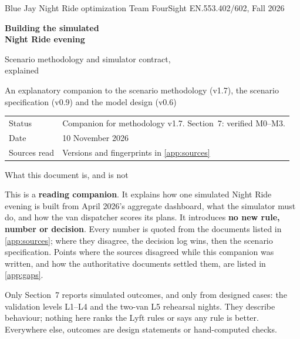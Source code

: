 \documentclass[11pt,letterpaper]{article}
\newenvironment{callout}[1][]{%
  \def\FrameCommand{\fboxsep=8pt\colorbox{shade}}%
  \MakeFramed{\advance\hsize-\width\FrameRestore}%
  \ifx\relax#1\relax\else{\sffamily\bfseries\color{heading}#1}\par\smallskip\fi}%
  {\endMakeFramed}
\begin{document}
\begin{titlepage}
\thispagestyle{empty}
\vspace*{0.6in}
{\sffamily\small\color{muted} Blue Jay Night Ride optimization \textbar{} Team FourSight \textbar{} EN.553.402/602, Fall 2026\par}
\vspace{0.25in}
{\sffamily\fontsize{24}{29}\selectfont\bfseries\color{heading} Building the simulated\\ Night Ride evening\par}
\vspace{0.12in}
{\sffamily\Large\color{heading} Scenario methodology and simulator contract,\\ explained\par}
\vspace{0.35in}
{\large An explanatory companion to the scenario methodology (v1.7), the scenario specification (v0.9) and the model design (v0.6)\par}
\vspace{0.3in}
{\sffamily\small
\begin{tabular}{@{}ll@{}}
Status & Companion for methodology v1.7. Section~7: verified M0--M3.\\
Date & 10 November 2026\\
Sources read & Versions and fingerprints in \cref{app:sources}\\
\end{tabular}\par}
\vfill
\begin{callout}[What this document is, and is not]
This is a \textbf{reading companion}. It explains how one simulated Night Ride evening is built from April 2026's aggregate dashboard, what the simulator must do, and how the van dispatcher scores its plans. It introduces \textbf{no new rule, number or decision}. Every number is quoted from the documents listed in \cref{app:sources}; where they disagree, the decision log wins, then the scenario specification. Points where the sources disagreed while this companion was written, and how the authoritative documents settled them, are listed in \cref{app:gaps}.

Only Section~7 reports simulated outcomes, and only from designed cases: the validation levels L1--L4 and the two-van L5 rehearsal nights. They describe behaviour; nothing here ranks the Lyft rules or says any rule is better. Everywhere else, outcomes are design statements or hand-computed checks.
\end{callout}
\end{titlepage}
\end{document}
